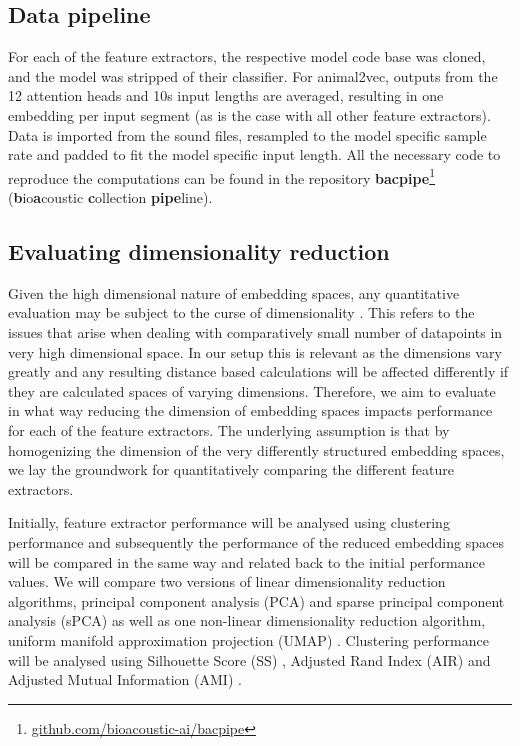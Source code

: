 



\subsection{Data pipeline}
\label{ssub:data_pipe}

For each of the feature extractors, the respective model code base was cloned, and the model was stripped of their classifier.
For animal2vec, outputs from the 12 attention heads and 10s input lengths are averaged, resulting in one embedding per input segment (as is the case with all other feature extractors).
Data is imported from the sound files, resampled to the model specific sample rate and padded to fit the model specific input length.
All the necessary code to reproduce the computations can be found in the repository \textbf{bacpipe}\footnote{\url{github.com/bioacoustic-ai/bacpipe}} (\textbf{b}io\textbf{a}coustic \textbf{c}ollection \textbf{pipe}line).

\subsection{Evaluating dimensionality reduction}
\label{ssub:eval_dim_reduc}


Given the high dimensional nature of embedding spaces, any quantitative evaluation may be subject to the curse of dimensionality \cite{bellman_dynamic_1957}.
This refers to the issues that arise when dealing with comparatively small number of datapoints in very high dimensional space.
In our setup this is relevant as the dimensions vary greatly and any resulting distance based calculations will be affected differently if they are calculated spaces of varying dimensions. 
Therefore, we aim to evaluate in what way reducing the dimension of embedding spaces impacts performance for each of the feature extractors.
The underlying assumption is that by homogenizing the dimension of the very differently structured embedding spaces, we lay the groundwork for quantitatively comparing the different feature extractors.

Initially, feature extractor performance will be analysed using clustering performance and subsequently the performance of the reduced embedding spaces will be compared in the same way and related back to the initial performance values.
We will compare two versions of linear dimensionality reduction algorithms, principal component analysis (PCA) \cite{wold_principal_1987} and sparse principal component analysis (sPCA) \cite{zou_sparse_2006} as well as one non-linear dimensionality reduction algorithm, uniform manifold approximation projection (UMAP) \cite{mcinnes_umap_2020}.
Clustering performance will be analysed using Silhouette Score (SS) \cite{rousseeuw_silhouettes_1987}, Adjusted Rand Index (AIR) \cite{steinley_variance_2016} and Adjusted Mutual Information (AMI) \cite{romano_standardized_2014}.

